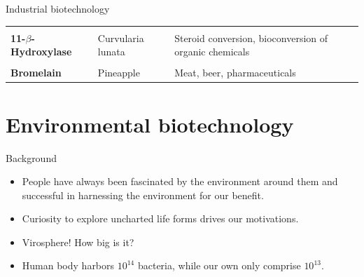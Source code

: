 \documentclass[
  ignorenonframetext,
  aspectratio=169]{beamer}
\providecommand{\tightlist}{%
  \setlength{\itemsep}{0pt}\setlength{\parskip}{0pt}}
\begin{document}
\begin{frame}{Industrial biotechnology}
\begin{table}
\begin{tabular}[t]{>{\raggedright\arraybackslash}p{8em}>{\raggedright\arraybackslash}p{26em}>{\raggedright\arraybackslash}p{30em}}
\textbf{\cellcolor{gray!6}{Trypsin}} & \cellcolor{gray!6}{Hog and calf pancreases} & \cellcolor{gray!6}{Meat, pharmaceuticals}\\
\textbf{11-$\beta$-Hydroxylase} & Curvularia lunata & Steroid conversion, bioconversion of organic chemicals\\
\addlinespace
\textbf{\cellcolor{gray!6}{Ficin}} & \cellcolor{gray!6}{Figs} & \cellcolor{gray!6}{Leather, meat, pharmaceuticals}\\
\textbf{Bromelain} & Pineapple & Meat, beer, pharmaceuticals\\
\bottomrule
\end{tabular}
\end{table}
\end{frame}

\hypertarget{environmental-biotechnology}{%
\section{Environmental
biotechnology}\label{environmental-biotechnology}}

\begin{frame}{Background}
\protect\hypertarget{background-1}{}
\begin{itemize}
\tightlist
\item
  People have always been fascinated by the environment around them and
  successful in harnessing the environment for our benefit.
\item
  Curiosity to explore uncharted life forms drives our motivations.
\item
  Virosphere! How big is it?
\item
  Human body harbors \(10^14\) bacteria, while our own only comprise
  \(10^13\).
\end{itemize}
\end{frame}
\end{document}
